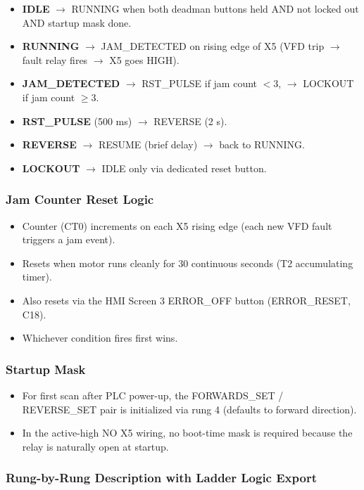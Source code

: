 \documentclass[hidelinks,12pt]{article}
\begin{document}
\begin{itemize}
    \item \textbf{IDLE} $\rightarrow$ RUNNING when both deadman buttons held AND not locked out AND startup mask done.
    \item \textbf{RUNNING} $\rightarrow$ JAM\_DETECTED on rising edge of X5 (VFD trip $\rightarrow$ fault relay fires $\rightarrow$ X5 goes HIGH).
    \item \textbf{JAM\_DETECTED} $\rightarrow$ RST\_PULSE if jam count $< 3$, $\rightarrow$ LOCKOUT if jam count $\geq 3$.
    \item \textbf{RST\_PULSE} (500 ms) $\rightarrow$ REVERSE (2 s).
    \item \textbf{REVERSE} $\rightarrow$ RESUME (brief delay) $\rightarrow$ back to RUNNING.
    \item \textbf{LOCKOUT} $\rightarrow$ IDLE only via dedicated reset button.
\end{itemize}

\subsubsection{Jam Counter Reset Logic}
\begin{itemize}
    \item Counter (CT0) increments on each X5 rising edge (each new VFD fault triggers a jam event).
    \item Resets when motor runs cleanly for 30 continuous seconds (T2 accumulating timer).
    \item Also resets via the HMI Screen 3 ERROR\_OFF button (ERROR\_RESET, C18).
    \item Whichever condition fires first wins.
\end{itemize}

\subsubsection{Startup Mask}
\begin{itemize}
    \item For first scan after PLC power-up, the FORWARDS\_SET / REVERSE\_SET pair is initialized via rung 4 (defaults to forward direction).
    \item In the active-high NO X5 wiring, no boot-time mask is required because the relay is naturally open at startup.
\end{itemize}

\subsubsection{Rung-by-Rung Description with Ladder Logic Export}
\end{document}
